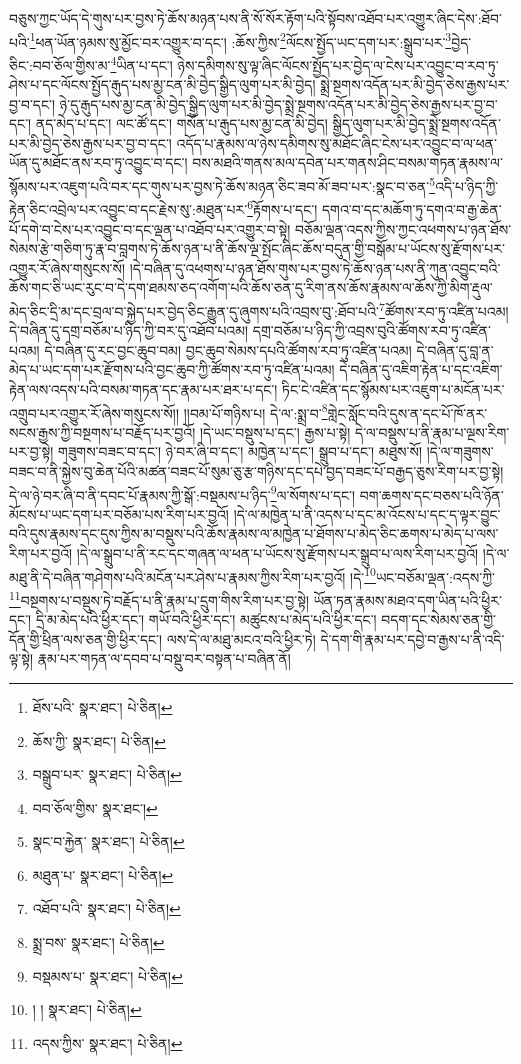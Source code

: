 བཅུས་ཀྱང་ཡོད་དེ་གུས་པར་བྱས་ཏེ་ཆོས་མཉན་པས་ནི་སོ་སོར་རྟོག་པའི་སྟོབས་འཐོབ་པར་འགྱུར་ཞིང་དེས་:ཐོབ་པའི་\footnote{ཐོས་པའི་  སྣར་ཐང་།  པེ་ཅིན། }ཕན་ཡོན་ཉམས་སུ་མྱོང་བར་འགྱུར་བ་དང་། :ཆོས་ཀྱིས་\footnote{ཆོས་ཀྱི་  སྣར་ཐང་།  པེ་ཅིན། }ལོངས་སྤྱོད་ཡང་དག་པར་:སྒྲུབ་པར་\footnote{བསྒྲུབ་པར་  སྣར་ཐང་།  པེ་ཅིན། }བྱེད་ཅིང་:བབ་ཅོལ་གྱིས་མ་\footnote{བབ་ཅོལ་གྱིས་  སྣར་ཐང་། }ཡིན་པ་དང་། ཉེས་དམིགས་སུ་ལྟ་ཞིང་ལོངས་སྤྱོད་པར་བྱེད་ལ་ངེས་པར་འབྱུང་བ་རབ་ཏུ་ཤེས་པ་དང་ལོངས་སྤྱོད་རྒུད་པས་མྱ་ངན་མི་བྱེད་སྒྱིད་ལུག་པར་མི་བྱེད། སྨྲེ་སྔགས་འདོན་པར་མི་བྱེད་ཅེས་རྒྱས་པར་བྱ་བ་དང་། ཉེ་དུ་རྒུད་པས་མྱ་ངན་མི་བྱེད་སྒྱིད་ལུག་པར་མི་བྱེད་སྨྲེ་སྔགས་འདོན་པར་མི་བྱེད་ཅེས་རྒྱས་པར་བྱ་བ་དང་། ནད་མེད་པ་དང་། ལང་ཚོ་དང་། གསོན་པ་རྒུད་པས་མྱ་ངན་མི་བྱེད། སྒྱིད་ལུག་པར་མི་བྱེད་སྨྲེ་སྔགས་འདོན་པར་མི་བྱེད་ཅེས་རྒྱས་པར་བྱ་བ་དང་། འདོད་པ་རྣམས་ལ་ཉེས་དམིགས་སུ་མཐོང་ཞིང་ངེས་པར་འབྱུང་བ་ལ་ཕན་ཡོན་དུ་མཐོང་ནས་རབ་ཏུ་འབྱུང་བ་དང་། བས་མཐའི་གནས་མལ་དབེན་པར་གནས་ཤིང་བསམ་གཏན་རྣམས་ལ་སྙོམས་པར་འཇུག་པའི་བར་དང་གུས་པར་བྱས་ཏེ་ཆོས་མཉན་ཅིང་ཟབ་མོ་ཟབ་པར་:སྣང་བ་ཅན་\footnote{སྣང་བ་རྐྱེན་  སྣར་ཐང་།  པེ་ཅིན། }འདི་པ་ཉིད་ཀྱི་རྟེན་ཅིང་འབྲེལ་པར་འབྱུང་བ་དང་རྗེས་སུ་:མཐུན་པར་\footnote{མཐུན་པ་  སྣར་ཐང་།  པེ་ཅིན། }རྟོགས་པ་དང་། དགའ་བ་དང་མཆོག་ཏུ་དགའ་བ་རྒྱ་ཆེན་པོ་དགེ་བ་ངེས་པར་འབྱུང་བ་དང་ལྡན་པ་འཐོབ་པར་འགྱུར་བ་སྟེ། བཅོམ་ལྡན་འདས་ཀྱིས་ཀྱང་འཕགས་པ་ཉན་ཐོས་སེམས་རྩེ་གཅིག་ཏུ་རྣ་བ་བླགས་ཏེ་ཆོས་ཉན་པ་ནི་ཆོས་ལྔ་སྤོང་ཞིང་ཆོས་བདུན་གྱི་བསྒོམ་པ་ཡོངས་སུ་རྫོགས་པར་འགྱུར་རོ་ཞེས་གསུངས་སོ། །དེ་བཞིན་དུ་འཕགས་པ་ཉན་ཐོས་གུས་པར་བྱས་ཏེ་ཆོས་ཉན་པས་ནི་ཀུན་འབྱུང་བའི་ཆོས་གང་ཅི་ཡང་རུང་བ་དེ་དག་ཐམས་ཅད་འགོག་པའི་ཆོས་ཅན་དུ་རིག་ནས་ཆོས་རྣམས་ལ་ཆོས་ཀྱི་མིག་རྡུལ་མེད་ཅིང་དྲི་མ་དང་བྲལ་བ་སྐྱེད་པར་བྱེད་ཅིང་རྒྱུན་དུ་ཞུགས་པའི་འབྲས་བུ་:ཐོབ་པའི་\footnote{འཐོབ་པའི་  སྣར་ཐང་།  པེ་ཅིན། }ཚོགས་རབ་ཏུ་འཛིན་པའམ། དེ་བཞིན་དུ་དགྲ་བཅོམ་པ་ཉིད་ཀྱི་བར་དུ་འཐོབ་པའམ། དགྲ་བཅོམ་པ་ཉིད་ཀྱི་འབྲས་བུའི་ཚོགས་རབ་ཏུ་འཛིན་པའམ། དེ་བཞིན་དུ་རང་བྱང་ཆུབ་བམ། བྱང་ཆུབ་སེམས་དཔའི་ཚོགས་རབ་ཏུ་འཛིན་པའམ། དེ་བཞིན་དུ་བླ་ན་མེད་པ་ཡང་དག་པར་རྫོགས་པའི་བྱང་ཆུབ་ཀྱི་ཚོགས་རབ་ཏུ་འཛིན་པའམ། དེ་བཞིན་དུ་འཇིག་རྟེན་པ་དང་འཇིག་རྟེན་ལས་འདས་པའི་བསམ་གཏན་དང་རྣམ་པར་ཐར་པ་དང་། ཏིང་ངེ་འཛིན་དང་སྙོམས་པར་འཇུག་པ་མངོན་པར་འགྲུབ་པར་འགྱུར་རོ་ཞེས་གསུངས་སོ།། །།བམ་པོ་གཉིས་པ། དེ་ལ་:སྨྲ་བ་\footnote{སྨྲ་བས་  སྣར་ཐང་།  པེ་ཅིན། }གླེང་སློང་བའི་དུས་ན་དང་པོ་ཁོ་ནར་སངས་རྒྱས་ཀྱི་བསྔགས་པ་བརྗོད་པར་བྱའོ། །དེ་ཡང་བསྡུས་པ་དང་། རྒྱས་པ་སྟེ། དེ་ལ་བསྡུས་པ་ནི་རྣམ་པ་ལྔས་རིག་པར་བྱ་སྟེ། གཟུགས་བཟང་བ་དང་། ཉེ་བར་ཞི་བ་དང་། མཁྱེན་པ་དང་། སྒྲུབ་པ་དང་། མཐུས་སོ། །དེ་ལ་གཟུགས་བཟང་བ་ནི་སྐྱེས་བུ་ཆེན་པོའི་མཚན་བཟང་པོ་སུམ་ཅུ་རྩ་གཉིས་དང་དཔེ་བྱད་བཟང་པོ་བརྒྱད་ཅུས་རིག་པར་བྱ་སྟེ། དེ་ལ་ཉེ་བར་ཞི་བ་ནི་དབང་པོ་རྣམས་ཀྱི་སྒོ་:བསྡམས་པ་ཉིད་\footnote{བསྡམས་པ་  སྣར་ཐང་།  པེ་ཅིན། }ལ་སོགས་པ་དང་། བག་ཆགས་དང་བཅས་པའི་ཉོན་མོངས་པ་ཡང་དག་པར་བཅོམ་པས་རིག་པར་བྱའོ། །དེ་ལ་མཁྱེན་པ་ནི་འདས་པ་དང་མ་འོངས་པ་དང་ད་ལྟར་བྱུང་བའི་དུས་རྣམས་དང་དུས་ཀྱིས་མ་བསྡུས་པའི་ཆོས་རྣམས་ལ་མཁྱེན་པ་ཐོགས་པ་མེད་ཅིང་ཆགས་པ་མེད་པ་ལས་རིག་པར་བྱའོ། །དེ་ལ་སྒྲུབ་པ་ནི་རང་དང་གཞན་ལ་ཕན་པ་ཡོངས་སུ་རྫོགས་པར་སྒྲུབ་པ་ལས་རིག་པར་བྱའོ། །དེ་ལ་མཐུ་ནི་དེ་བཞིན་གཤེགས་པའི་མངོན་པར་ཤེས་པ་རྣམས་ཀྱིས་རིག་པར་བྱའོ། །དེ་\footnote{། །  སྣར་ཐང་།  པེ་ཅིན། }ཡང་བཅོམ་ལྡན་:འདས་ཀྱི་\footnote{འདས་ཀྱིས་  སྣར་ཐང་།  པེ་ཅིན། }བསྔགས་པ་བསྡུས་ཏེ་བརྗོད་པ་ནི་རྣམ་པ་དྲུག་གིས་རིག་པར་བྱ་སྟེ། ཡོན་ཏན་རྣམས་མཐའ་དག་ཡིན་པའི་ཕྱིར་དང་། དྲི་མ་མེད་པའི་ཕྱིར་དང་། གཡོ་བའི་ཕྱིར་དང་། མཚུངས་པ་མེད་པའི་ཕྱིར་དང་། བདག་དང་སེམས་ཅན་གྱི་དོན་གྱི་ཕྲིན་ལས་ཅན་གྱི་ཕྱིར་དང་། ལས་དེ་ལ་མཐུ་མངའ་བའི་ཕྱིར་ཏེ། དེ་དག་གི་རྣམ་པར་དབྱེ་བ་རྒྱས་པ་ནི་འདི་ལྟ་སྟེ། རྣམ་པར་གཏན་ལ་དབབ་པ་བསྡུ་བར་བསྟན་པ་བཞིན་ནོ། 